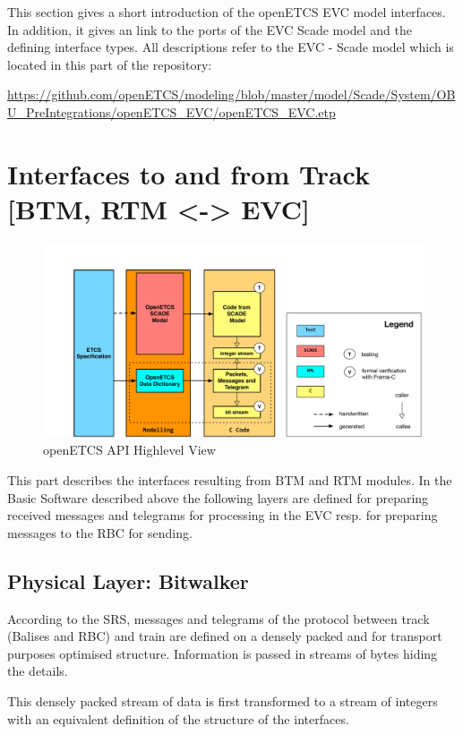 \documentclass{template/openetcs_report}
\begin{document}
This section gives a short introduction of the openETCS EVC model interfaces. In addition, it gives an link to the ports of the EVC Scade model and the defining interface types. All descriptions refer to the EVC - Scade model which is located in this part of the repository:

\url{https://github.com/openETCS/modeling/blob/master/model/Scade/System/OBU_PreIntegrations/openETCS_EVC/openETCS_EVC.etp}

\section{Interfaces to and from Track [BTM, RTM <-> EVC]}

\begin{figure}[hbtp]
\centering
\includegraphics[width=\linewidth]{OpenETCS-Stack.pdf}
\caption{openETCS API Highlevel View}
\label{fig:apiHighLevel}
\end{figure}

This part describes the interfaces resulting from BTM and RTM modules. In the Basic Software described above the following layers are defined for preparing received messages and telegrams for processing in the EVC resp. for preparing messages to the RBC for sending.

\subsection{Physical Layer: Bitwalker}
According to the SRS, messages and telegrams of the protocol between track (Balises and RBC) and train are defined on a densely packed and for transport purposes optimised structure. Information is passed in streams of bytes hiding the details. 

This densely packed stream of data is first transformed to a stream of integers with an equivalent definition of the structure of the interfaces.
\end{document}
